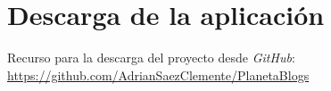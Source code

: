 \documentclass[a4paper, 12pt]{book}
\begin{document}
\chapter{Descarga de la aplicaci\'on}
\label{app:descarga}
Recurso para la descarga del proyecto desde \textit{GitHub}:\\
\href{https://github.com/AdrianSaezClemente/PlanetaBlogs}{https://github.com/AdrianSaezClemente/PlanetaBlogs}

\cleardoublepage


\end{document}
